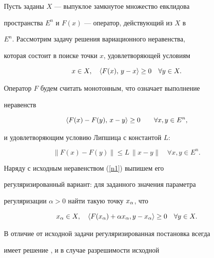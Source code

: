 Пусть заданы $X$ --- выпуклое замкнутое множество евклидова


пространства $E^n$ и $F(x)$ --- оператор, действующий из $X$ в


$E^n$. Рассмотрим задачу решения вариационного неравенства,


которая состоит в поиске точки $x$, удовлетворяющей условиям


\begin{equation}\label{n1}


x\in X,\quad \lft F(x),\,y-x \rgt\geq0\quad


\forall y\in X.


\end{equation}


Оператор $F$ будем считать монотонным, что означает выполнение


неравенств


$$




\lft F(x)-F(y),\,x-y\rgt \geq0\qquad\forall x,y\in E^n,




$$


и удовлетворяющим условию Липшица с константой $L$:


$$




\| F(x)-F(y)\| \leq L\,\|x-y\| \quad\forall x,y\in E^n.




$$


Наряду с исходным неравенством (\ref{n1}) выпишем его


регуляризированный вариант: для заданного значения параметра


регуляризации $\alpha>0$ найти такую точку $x_{\alpha}$, что


\begin{equation}\label{n2}


\xa\in X,\quad \lft F(\xa)+\alpha\xa,y-\xa \rgt\geq0\quad


\forall y\in X.


\end{equation}


В отличие от исходной задачи регуляризированная постановка всегда


имеет решение \cite{baioki}, и в случае разрешимости исходной


